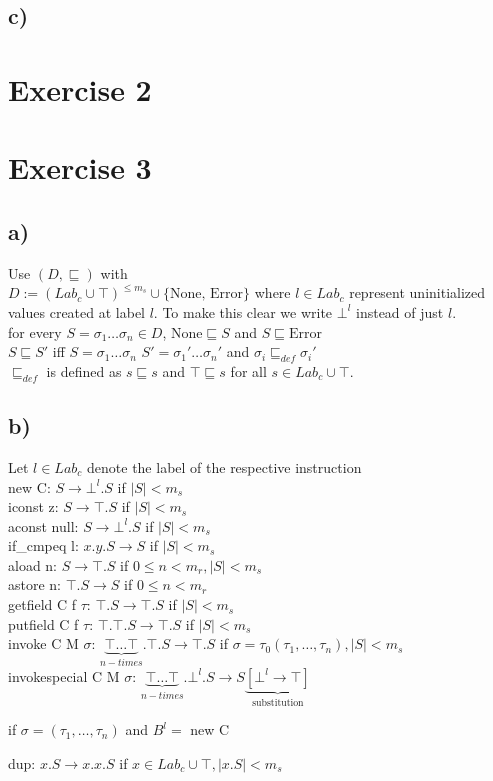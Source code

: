 \documentclass[fleqn,12pt]{article}
\begin{document}
\subsection*{c)}
\section*{Exercise 2}
\section*{Exercise 3}
\subsection*{a)}
Use $(D,\sqsubseteq)$ with\\
$D := (Lab_c \cup \top)^{\leq m_s} \cup \{\text{None, Error}\}$ where $l \in Lab_c$ represent uninitialized values created at label $l$. To make this clear we write $\bot^l$ instead of just $l$.\\

for every $S=\sigma_1\dots\sigma_n \in D$, $\text{None} \sqsubseteq S$ and $S \sqsubseteq \text{Error}$\\
$S \sqsubseteq S'$ iff $S=\sigma_1\dots\sigma_n$ $S'=\sigma_1'\dots\sigma_n'$ and $\sigma_i \sqsubseteq_{def} \sigma_i'$\\
$\sqsubseteq_{def}$ is defined as $s \sqsubseteq s$ and $\top \sqsubseteq s$ for all $s \in Lab_c \cup \top$.
\subsection*{b)}
Let $l \in Lab_c$ denote the label of the respective instruction\\

new C: $S \rightarrow \bot^l.S$ if $|S| < m_s$\\
iconst z: $S \rightarrow \top.S$ if $|S| < m_s$\\
aconst null: $S \rightarrow \bot^l.S$ if $|S| < m_s$\\
if\_cmpeq l: $x.y.S \rightarrow S$ if $|S| < m_s$\\
aload n: $S \rightarrow \top.S$ if $0\leq n < m_r, |S| < m_s$\\
astore n: $\top.S \rightarrow S$ if $0\leq n < m_r$\\
getfield C f $\tau$: $\top.S \rightarrow \top.S$ if $|S| < m_s$\\
putfield C f $\tau$: $\top.\top.S \rightarrow \top.S$ if $|S| < m_s$ \\
invoke C M $\sigma$: $\underbrace{\top\dots\top}_{n-times}.\top.S \rightarrow \top.S$ if $\sigma = \tau_0(\tau_1,\dots,\tau_n),|S| < m_s$\\
invokespecial C M $\sigma$: $\underbrace{\top\dots\top}_{n-times}.\bot^l.S \rightarrow S\underbrace{[\bot^l \rightarrow \top]}_{\text{substitution}}$ 
\begin{flushright}
if $\sigma = (\tau_1,\dots,\tau_n)$ and $B^l =$ new C
\end{flushright}
dup: $x.S \rightarrow x.x.S$ if $x \in Lab_c \cup \top, |x.S| < m_s$\\
\end{document}
